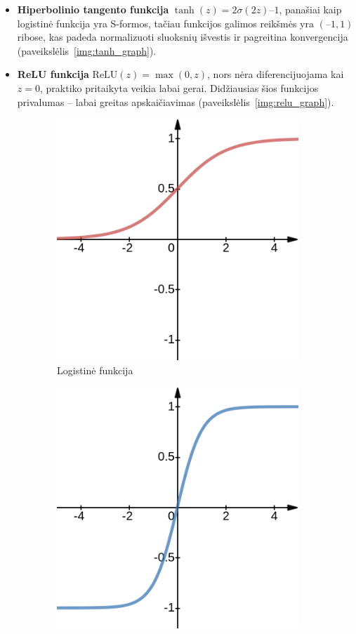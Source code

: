 \documentclass{VUMIFPSbakalaurinis}
\begin{document}
{\begin{itemize}
		\item \textbf{Hiperbolinio tangento funkcija} \(\tanh(z) = 2\sigma(2z) – 1\), panašiai kaip logistinė funkcija yra S-formos, tačiau funkcijos galimos reikšmės yra \((–1, 1)\) ribose, kas padeda normalizuoti sluoksnių išvestis ir pagreitina konvergencija (paveikslėlis~\ref{img:tanh_graph}).
		
		\item \textbf{ReLU funkcija} \(\textrm{ReLU}(z) = \max(0, z)\), nors nėra diferencijuojama kai \(z=0\), praktiko pritaikyta veikia labai gerai. Didžiausias šios funkcijos privalumas -- labai greitas apskaičiavimas (paveikslėlis~\ref{img:relu_graph}).
	\end{itemize}
	
	
	\begin{figure}[H]
		\centering
		\begin{subfigure}[b]{.333\textwidth}
			\centering
			\includegraphics[width=.75\textwidth]{img/log_graph}
			\caption{Logistinė funkcija}
			\label{img:log_graph}
		\end{subfigure}%
		\begin{subfigure}[b]{.333\textwidth}
			\centering
			\includegraphics[width=.75\textwidth]{img/tanh_graph}

\end{subfigure}
\end{figure}}
\end{document}
